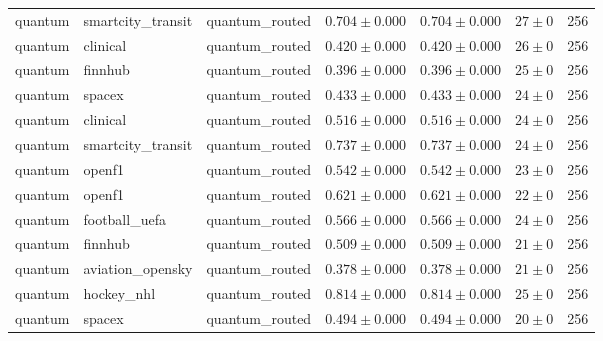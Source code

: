 \begin{table}[htbp]
\begin{tabular}{l l l r r r r}
quantum & smartcity\_transit & quantum\_routed & $0.704\pm0.000$ & $0.704\pm0.000$ & $27\pm0$ & 256 \\
quantum & clinical & quantum\_routed & $0.420\pm0.000$ & $0.420\pm0.000$ & $26\pm0$ & 256 \\
quantum & finnhub & quantum\_routed & $0.396\pm0.000$ & $0.396\pm0.000$ & $25\pm0$ & 256 \\
quantum & spacex & quantum\_routed & $0.433\pm0.000$ & $0.433\pm0.000$ & $24\pm0$ & 256 \\
quantum & clinical & quantum\_routed & $0.516\pm0.000$ & $0.516\pm0.000$ & $24\pm0$ & 256 \\
quantum & smartcity\_transit & quantum\_routed & $0.737\pm0.000$ & $0.737\pm0.000$ & $24\pm0$ & 256 \\
quantum & openf1 & quantum\_routed & $0.542\pm0.000$ & $0.542\pm0.000$ & $23\pm0$ & 256 \\
quantum & openf1 & quantum\_routed & $0.621\pm0.000$ & $0.621\pm0.000$ & $22\pm0$ & 256 \\
quantum & football\_uefa & quantum\_routed & $0.566\pm0.000$ & $0.566\pm0.000$ & $24\pm0$ & 256 \\
quantum & finnhub & quantum\_routed & $0.509\pm0.000$ & $0.509\pm0.000$ & $21\pm0$ & 256 \\
quantum & aviation\_opensky & quantum\_routed & $0.378\pm0.000$ & $0.378\pm0.000$ & $21\pm0$ & 256 \\
quantum & hockey\_nhl & quantum\_routed & $0.814\pm0.000$ & $0.814\pm0.000$ & $25\pm0$ & 256 \\
quantum & spacex & quantum\_routed & $0.494\pm0.000$ & $0.494\pm0.000$ & $20\pm0$ & 256 \\
\hline
\end{tabular}
\end{table}
